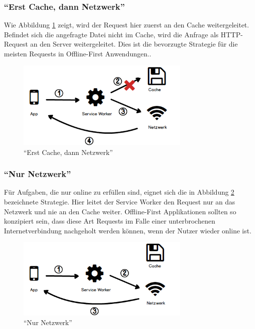 \documentclass[a4paper, 12pt]{scrreprt}
\begin{document}
\subsubsection{\enquote{Erst Cache, dann Netzwerk}}
\label{sec:cachedannnetzwerk}
Wie Abbildung \ref{fig:cachingCacheFirst} zeigt, wird der Request hier zuerst an den Cache weitergeleitet. Befindet sich die angefragte Datei nicht im Cache, wird die Anfrage als \ac{HTTP}-Request an den Server weitergeleitet. Dies ist die bevorzugte Strategie für die meisten Requests in Offline-First Anwendungen.\autocite[Kapitel 05]{BookBuildingPWAs}.

\begin{figure}[h]
	\centering
	\includegraphics[width=0.75\textwidth]{cachefirst.png}
	\caption{\enquote{Erst Cache, dann Netzwerk}}
	\label{fig:cachingCacheFirst}
\end{figure}

\subsubsection{\enquote{Nur Netzwerk}}
Für Aufgaben, die nur online zu erfüllen sind, eignet sich die in Abbildung \ref{fig:cachingNetworkOnly} bezeichnete Strategie. Hier leitet der Service Worker den Request nur an das Netzwerk und nie an den Cache weiter. Offline-First Applikationen sollten so konzipiert sein, dass diese Art Requests im Falle einer unterbrochenen Internetverbindung nachgeholt werden können, wenn der Nutzer wieder online ist.

\begin{figure}[h]
	\centering
	\includegraphics[width=0.75\textwidth]{networkonly.png}
	\caption{\enquote{Nur Netzwerk}}
	\label{fig:cachingNetworkOnly}
\end{figure}
\end{document}
